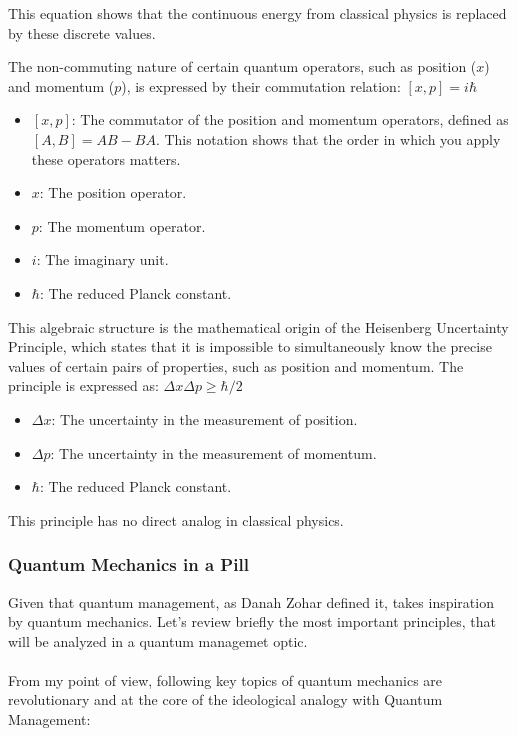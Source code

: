 \documentclass{article}
\begin{document}
This equation shows that the continuous energy from classical physics is replaced by these discrete values.



The non-commuting nature of certain quantum operators, such as position ($x$) and momentum ($p$), is expressed by their commutation relation:
$[x,p] = i\hbar$

\begin{itemize}
	\item $[x,p]$: The commutator of the position and momentum operators, defined as $[A, B] = AB - BA$. This notation shows that the order in which you apply these operators matters.
	\item $x$: The position operator.
	\item $p$: The momentum operator.
	\item $i$: The imaginary unit.
	\item $\hbar$: The reduced Planck constant.
\end{itemize}

This algebraic structure is the mathematical origin of the Heisenberg Uncertainty Principle, which states that it is impossible to simultaneously know the precise values of certain pairs of properties, such as position and momentum. The principle is expressed as:
$\Delta x \Delta p \geq \hbar/2$

\begin{itemize}
	\item $\Delta x$: The uncertainty in the measurement of position.
	\item $\Delta p$: The uncertainty in the measurement of momentum.
	\item $\hbar$: The reduced Planck constant.
\end{itemize}

This principle has no direct analog in classical physics.
\newpage
\subsubsection*{Quantum Mechanics in a Pill}
Given that quantum management, as Danah Zohar defined it, takes inspiration by quantum mechanics. Let's review briefly the most important principles, that will be analyzed in a quantum managemet optic.
\\\\
From my point of view, following key topics of quantum mechanics are revolutionary and at the core of the ideological analogy with Quantum Management:
\end{document}
